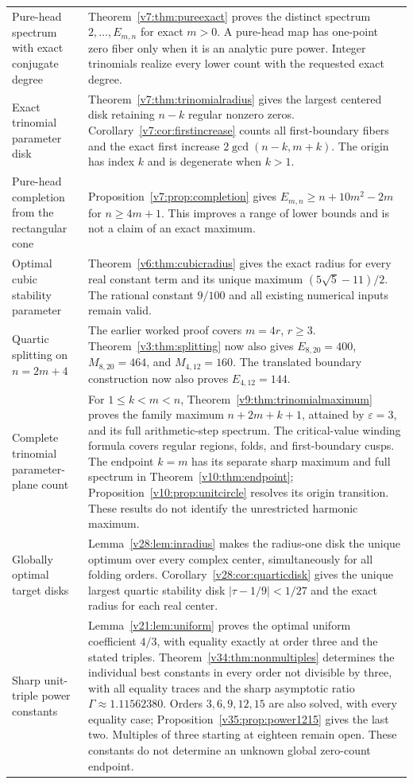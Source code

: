 \documentclass[UTF8,11pt]{ctexart}
\theoremstyle{definition}
\numberwithin{equation}{section}
\begin{document}
\begin{longtable}{@{}>{\raggedright\arraybackslash}p{}>{\raggedright\arraybackslash}p{}@{}}
Pure-head spectrum with exact conjugate degree & Theorem~\ref{v7:thm:pureexact} proves the distinct spectrum $2,\ldots,E_{m,n}$ for exact $m>0$. A pure-head map has one-point zero fiber only when it is an analytic pure power. Integer trinomials realize every lower count with the requested exact degree. \\
Exact trinomial parameter disk & Theorem~\ref{v7:thm:trinomialradius} gives the largest centered disk retaining $n-k$ regular nonzero zeros. Corollary~\ref{v7:cor:firstincrease} counts all first-boundary fibers and the exact first increase $2\gcd(n-k,m+k)$. The origin has index $k$ and is degenerate when $k>1$. \\
Pure-head completion from the rectangular cone & Proposition~\ref{v7:prop:completion} gives $E_{m,n}\ge n+10m^2-2m$ for $n\ge4m+1$. This improves a range of lower bounds and is not a claim of an exact maximum. \\
Optimal cubic stability parameter & Theorem~\ref{v6:thm:cubicradius} gives the exact radius for every real constant term and its unique maximum $(5\sqrt5-11)/2$. The rational constant $9/100$ and all existing numerical inputs remain valid. \\
Quartic splitting on $n=2m+4$ & The earlier worked proof covers $m=4r$, $r\ge3$. Theorem~\ref{v3:thm:splitting} now also gives $E_{8,20}=400$, $M_{8,20}=464$, and $M_{4,12}=160$. The translated boundary construction now also proves $E_{4,12}=144$. \\
Complete trinomial parameter-plane count & For $1\le k<m<n$, Theorem~\ref{v9:thm:trinomialmaximum} proves the family maximum $n+2m+k+1$, attained by $\varepsilon=3$, and its full arithmetic-step spectrum. The critical-value winding formula covers regular regions, folds, and first-boundary cusps. The endpoint $k=m$ has its separate sharp maximum and full spectrum in Theorem~\ref{v10:thm:endpoint}; Proposition~\ref{v10:prop:unitcircle} resolves its origin transition. These results do not identify the unrestricted harmonic maximum. \\
Globally optimal target disks & Lemma~\ref{v28:lem:inradius} makes the radius-one disk the unique optimum over every complex center, simultaneously for all folding orders. Corollary~\ref{v28:cor:quarticdisk} gives the unique largest quartic stability disk $|\tau-1/9|<1/27$ and the exact radius for each real center. \\
Sharp unit-triple power constants & Lemma~\ref{v21:lem:uniform} proves the optimal uniform coefficient $4/3$, with equality exactly at order three and the stated triples. Theorem~\ref{v34:thm:nonmultiples} determines the individual best constants in every order not divisible by three, with all equality traces and the sharp asymptotic ratio $\Gamma\approx1.11562380$. Orders $3,6,9,12,15$ are also solved, with every equality case; Proposition~\ref{v35:prop:power1215} gives the last two. Multiples of three starting at eighteen remain open. These constants do not determine an unknown global zero-count endpoint. \\

\end{longtable}
\end{document}
